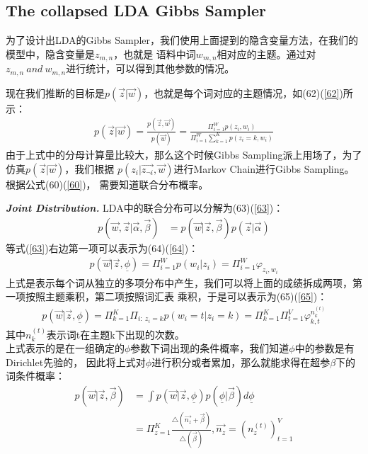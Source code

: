 \documentclass[UTF8]{ctexart}
\begin{document}
\subsection{The collapsed LDA Gibbs Sampler}
为了设计出LDA的Gibbs Sampler，我们使用上面提到的隐含变量方法，在我们的模型中，隐含变量是$z_{m,n}$，也就是
语料中词$w_{m,n}$相对应的主题。通过对$z_{m,n}\ and \ w_{m,n}$进行统计，可以得到其他参数的情况。
\par
现在我们推断的目标是$p(\vec{z}|\vec{w})$，也就是每个词对应的主题情况，如(62)(\ref{62})所示：
\begin{align}
\label{62}
p(\vec{z}|\vec{w}) = \frac{p(\vec{z},\vec{w})}{p(\vec{w})} 
= \frac{\Pi_{i=1}^W p(z_i, w_i)}{\Pi_{i=1}^W\sum_{k=1}^Kp(z_i=k,w_i)}
\end{align}
由于上式中的分母计算量比较大，那么这个时候Gibbs Sampling派上用场了，为了仿真$p(\vec{z}|\vec{w})$，我们根据
$p(z_i|\vec{z_{\neg i}}, \vec{w})$进行Markov Chain进行Gibbs Sampling。根据公式(60)(\ref{60})，
需要知道联合分布概率。
\par
\emph{\textbf{Joint Distribution.}} LDA中的联合分布可以分解为(63)(\ref{63})：
\begin{align}
\label{63}
p(\vec{w}, \vec{z} | \vec{\alpha}, \vec{\beta}) &=
p(\vec{w}|\vec{z},\vec{\beta}) p(\vec{z}|\vec{\alpha})
\end{align}
等式(\ref{63})右边第一项可以表示为(64)(\ref{64})：
\begin{align}
\label{64}
p(\vec{w} | \vec{z}, \underline{\phi}) = \Pi_{i=1}^W p(w_i|z_i) 
= \Pi_{i=1}^W \varphi_{z_i, w_i}
\end{align}
上式是表示每个词从独立的多项分布中产生，我们可以将上面的成绩拆成两项，第一项按照主题乘积，第二项按照词汇表
乘积，于是可以表示为(65)(\ref{65})：
\begin{align}
\label{65}
p(\vec{w} | \vec{z}, \underline{\phi}) = 
\Pi_{k=1}^K \Pi_{i:\ z_i=k} p(w_i=t|z_i=k) =
\Pi_{k=1}^K \Pi_{t=1}^V \varphi_{k,t}^{n_k^{(t)}}
\end{align}
其中$n_k^{(t)}$表示词t在主题k下出现的次数。\\
上式表示的是在一组确定的$\phi$参数下词出现的条件概率，我们知道$\phi$中的参数是有Dirichlet先验的，
因此将上式对$\phi$进行积分或者累加，那么就能求得在超参$\beta$下的词条件概率：
\begin{align}
p(\vec{w}|\vec{z}, \vec{\beta}) &= \int 
p(\vec{w}|\vec{z}, \underline{\phi}) p(\underline{\phi}|\vec{\beta}) d\underline{\phi}
\\
&= \Pi_{z=1}^K \frac{\triangle(\vec{n_z}+\vec{\beta})}{\triangle(\vec{\beta})},
\vec{n_z}=\left( n_z^{(t)} \right)_{t=1}^V
\end{align}
\end{document}
